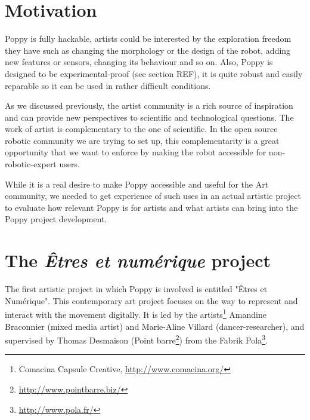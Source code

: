 \begin{figure}[t]
\centering
    \hfil
    \caption{}
    \label{fig:robot_emotion_cinema}
\end{figure}


\section{Motivation } %
\label{sec:motivation}

Poppy is fully hackable, artists could be interested by the exploration freedom they have such as changing the morphology or the design of the robot, adding new features or sensors, changing its behaviour and so on. Also, Poppy is designed to be experimental-proof (see section REF), it is quite robust and easily reparable so it can be used in rather difficult conditions.

As we discussed previously, the artist community is a rich source of inspiration and can provide new perspectives to scientific and technological questions. The work of artist is complementary to the one of scientific. In the open source robotic community we are trying to set up, this complementarity is a great opportunity that we want to enforce by making the robot accessible for non-robotic-expert users.

While it is a real desire to make Poppy accessible and useful for the Art community, we needed to get experience of such uses in an actual artistic project to evaluate how relevant Poppy is for artists and what artists can bring into the Poppy project development.


\section{The \emph{Êtres et numérique} project} %

The first artistic project in which Poppy is involved is entitled "Êtres et Numérique". This contemporary art project focuses on the way to represent and interact with the movement digitally. It is led by the artists\footnote{Comacina Capsule Creative, \url{http://www.comacina.org/}} Amandine Braconnier (mixed media artist) and Marie-Aline Villard (dancer-researcher), and supervised by Thomas Desmaison (Point barre\footnote{\url{http://www.pointbarre.biz/}}) from the Fabrik Pola\footnote{\url{http://www.pola.fr/}}.


